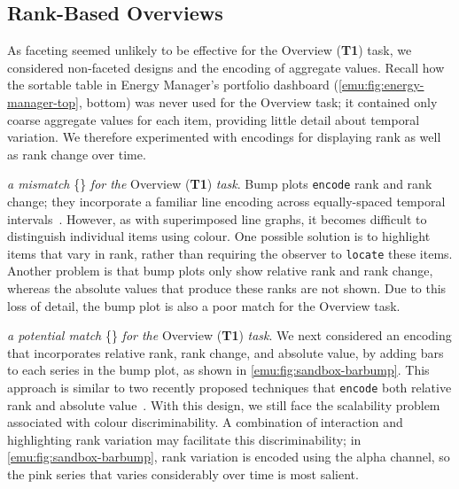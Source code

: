 \subsection{Rank-Based Overviews}
\label{emu:design-ranking}


As faceting seemed unlikely to be effective for the Overview ({\bf T1}) task, we considered non-faceted designs and the encoding of aggregate values.
Recall how the sortable table in Energy Manager's portfolio dashboard (\autoref{emu:fig:energy-manager-top}, bottom) was never used for the Overview task; it contained only coarse aggregate values for each item, providing little detail about temporal variation.
We therefore experimented with encodings for displaying rank as well as rank change over time.

 {\it a mismatch} \{\mismatch\} {\it for the} Overview ({\bf T1}) {\it task}.
Bump plots {\tt encode} rank and rank change; they incorporate a familiar line encoding across equally-spaced temporal intervals~\cite{Tufte1990}. 
However, as with superimposed line graphs, it becomes difficult to distinguish individual items using colour.
One possible solution is to highlight items that vary in rank, rather than requiring the observer to {\tt locate} these items.
Another problem is that bump plots only show relative rank and rank change, whereas the absolute values that produce these ranks are not shown. 
Due to this loss of detail, the bump plot is also a poor match for the Overview task.

 {\it a potential match} \{\posmatch\} {\it for the} Overview ({\bf T1}) {\it task}.
We next considered an encoding that incorporates relative rank, rank change, and absolute value, by adding bars to each series in the bump plot, as shown in \autoref{emu:fig:sandbox-barbump}. 
This approach is similar to two recently proposed techniques that {\tt encode} both relative rank and absolute value~\cite{Gratzl2013,Hur2013}. 
With this design, we still face the scalability problem associated with colour discriminability.
A combination of interaction and highlighting rank variation may facilitate this discriminability; in \autoref{emu:fig:sandbox-barbump}, rank variation is encoded using the alpha channel, so the pink series that varies considerably over time is most salient.

